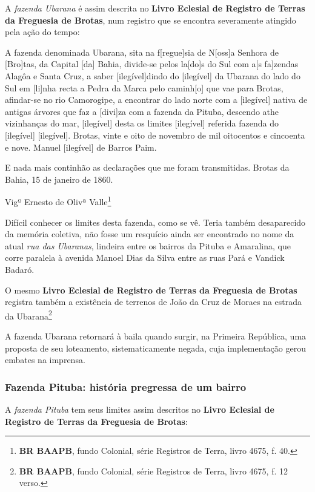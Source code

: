 A \textit{fazenda Ubarana} é assim descrita no \textbf{Livro Eclesial de Registro de Terras da Freguesia de Brotas}, num registro que se encontra severamente atingido pela ação do tempo:

\begin{citacao}
A fazenda denominada Ubarana, sita na f[regue]sia de N[oss]a Senhora de [Bro]tas, da Capital [da] Bahia, divide-se pelos la[do]s do Sul com a[s fa]zendas Alagôa e Santa Cruz, a saber [ilegível]dindo do [ilegível] da Ubarana do lado do Sul em [li]nha recta a Pedra da Marca pelo caminh[o] que vae para Brotas, afindar-se no rio Camorogipe, a encontrar do lado norte com a [ilegível] nativa de antigas árvores que faz a [divi]za com a fazenda da Pituba, descendo athe vizinhanças do mar, [ilegível] desta os limites [ilegível] referida fazenda do [ilegível] [ilegível]. Brotas, vinte e oito de novembro de mil oitocentos e cincoenta e nove. Manuel [ilegível] de Barros Paim.

E nada mais continhão as declarações que me foram transmitidas. Brotas da Bahia, 15 de janeiro de 1860.

Vigº Ernesto de Olivª Valle\footnote{\textbf{BR BAAPB}, fundo Colonial, série Registros de Terra, livro 4675, f. 40.}
\end{citacao}

Difícil conhecer os limites desta fazenda, como se vê. Teria também desaparecido da memória coletiva, não fosse um resquício ainda ser encontrado no nome da atual \textit{rua das Ubaranas}, lindeira entre os bairros da Pituba e Amaralina, que corre paralela à avenida Manoel Dias da Silva entre as ruas Pará e Vandick Badaró.

O mesmo \textbf{Livro Eclesial de Registro de Terras da Freguesia de Brotas} registra também a existência de terrenos de João da Cruz de Moraes na estrada da Ubarana\footnote{\textbf{BR BAAPB}, fundo Colonial, série Registros de Terra, livro 4675, f. 12 verso.}

A fazenda Ubarana retornará à baila quando surgir, na Primeira República, uma proposta de seu loteamento, sistematicamente negada, cuja implementação gerou embates na imprensa.

\subsubsection{Fazenda Pituba: história pregressa de um bairro}

A \textit{fazenda Pituba} tem seus limites assim descritos no \textbf{Livro Eclesial de Registro de Terras da Freguesia de Brotas}:

